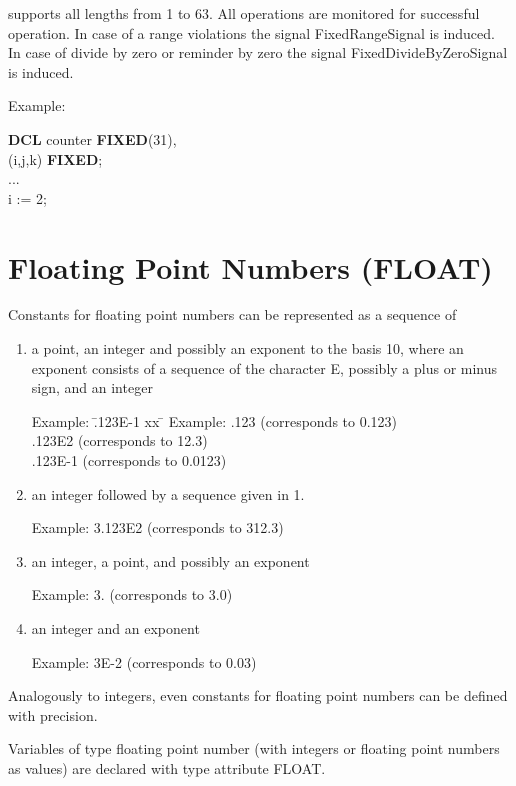\begin{added}
\OpenPEARL{} supports all lengths from 1 to 63.
All operations are monitored for successful operation.
In case of a range violations the signal FixedRangeSignal is induced.
In case of divide by zero or reminder by zero the signal FixedDivideByZeroSignal
is induced.
\end{added}

Example:

{\bf DCL} counter {\bf FIXED}(31),\\
\x (i,j,k) {\bf FIXED};\\
...\\
i := 2;

\section{Floating Point Numbers (FLOAT)}  %

Constants for floating point numbers can be represented as a sequence of
\begin{enumerate}
\item a point, an integer and possibly an exponent to the basis 10,
where an exponent consists of a sequence of the character E, possibly a
plus or minus sign, and an integer

\begin{tabbing}
Example: \= .123E-1 xx \=  \kill
Example: \> .123 \> (corresponds to 0.123)\\
 \> .123E2 \> (corresponds to 12.3)\\
 \> .123E-1 \> (corresponds to 0.0123)
\end{tabbing}

\item an integer followed by a sequence given in 1.

Example: 3.123E2 (corresponds to 312.3)

\item an integer, a point, and possibly an exponent

Example: 3. (corresponds to 3.0)

\item an integer and an exponent

Example: 3E-2 (corresponds to 0.03)
\end{enumerate}

Analogously to integers, even constants for floating point numbers can
be defined with precision.

Variables of type floating point number (with integers or floating point
numbers as values) are declared with type attribute FLOAT.

